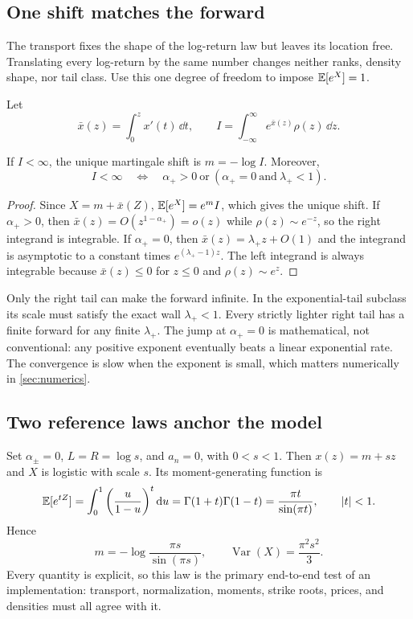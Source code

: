 \subsection{One shift matches the forward}

The transport fixes the shape of the log-return law but leaves its location
free.  Translating every log-return by the same number changes neither ranks,
density shape, nor tail class.  Use this one degree of freedom to impose
$\mathbb{E}[e^X]=1$.

Let
\[
\bar x(z)=\int_0^zx'(t)\,\dd t,
\qquad
I=\int_{-\infty}^{\infty}e^{\bar x(z)}\rho(z)\,\dd z.
\]

\begin{proposition}
\label{prop:shift}
If $I<\infty$, the unique martingale shift is $m=-\log I$.  Moreover,
\begin{equation}
I<\infty
\quad\Longleftrightarrow\quad
\alpha_+>0\ \text{or}\ (\alpha_+=0\ \text{and}\ \lambda_+<1).
\label{eq:martcondition}
\end{equation}
\end{proposition}

\begin{proof}
Since $X=m+\bar x(Z)$, $\mathbb{E}[e^X]=e^mI$, which gives the unique shift.
If $\alpha_+>0$, then $\bar x(z)=O(z^{1-\alpha_+})=o(z)$ while
$\rho(z)\sim e^{-z}$, so the right integrand is integrable.  If
$\alpha_+=0$, then $\bar x(z)=\lambda_+z+O(1)$ and the integrand is
asymptotic to a constant times $e^{(\lambda_+-1)z}$.  The left integrand is
always integrable because $\bar x(z)\le0$ for $z\le0$ and
$\rho(z)\sim e^z$.
\end{proof}

Only the right tail can make the forward infinite.  In the exponential-tail
subclass its scale must satisfy the exact wall $\lambda_+<1$.  Every strictly
lighter right tail has a finite forward for any finite $\lambda_+$.  The jump
at $\alpha_+=0$ is mathematical, not conventional: any positive exponent
eventually beats a linear exponential rate.  The convergence is slow when
the exponent is small, which matters numerically in \cref{sec:numerics}.

\subsection{Two reference laws anchor the model}
\label{sec:reference-laws}

Set $\alpha_\pm=0$, $L=R=\log s$, and $a_n=0$, with $0<s<1$.  Then
$x(z)=m+sz$ and $X$ is logistic with scale $s$.  Its moment-generating
function is
\begin{equation}
\mathbb{E}[e^{tZ}]
=\int_0^1\left(\frac{u}{1-u}\right)^t\mathrm{d} u
=\Gamma(1+t)\Gamma(1-t)
=\frac{\pi t}{\sin(\pi t)},\qquad |t|<1.
\label{eq:mgf}
\end{equation}
Hence
\begin{equation}
m=-\log\frac{\pi s}{\sin(\pi s)},
\qquad \operatorname{Var}(X)=\frac{\pi^2s^2}{3}.
\label{eq:logisticreference}
\end{equation}
Every quantity is explicit, so this law is the primary end-to-end test of an
implementation: transport, normalization, moments, strike roots, prices, and
densities must all agree with it.

